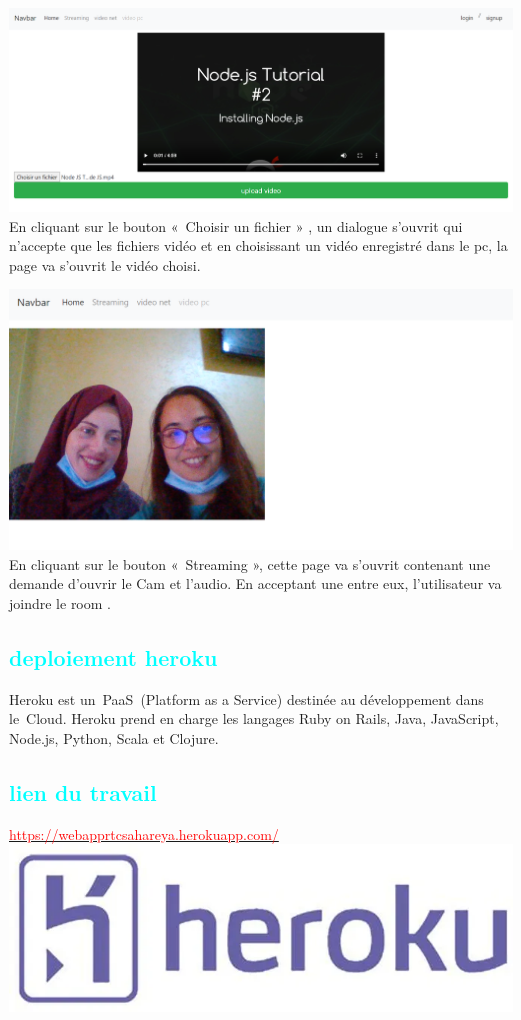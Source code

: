     \includegraphics[width=15cm]{images/videoPc2.png}\\
    En cliquant sur le bouton « Choisir un fichier » , un dialogue s’ouvrit qui n’accepte que les fichiers vidéo et en choisissant un vidéo enregistré dans le pc, la page va s’ouvrit le vidéo choisi.\par
    \includegraphics[width=15cm]{images/streaming.png}\\
    En cliquant sur le bouton « Streaming », cette page va s’ouvrit contenant une demande d’ouvrir le Cam et l’audio. En acceptant une entre eux, l’utilisateur va joindre le room .\par

\subsection{\textcolor{cyan}{deploiement heroku}}
Heroku est un PaaS (Platform as a Service) destinée au développement dans le Cloud. Heroku prend en charge les langages Ruby on Rails, Java, JavaScript, Node.js, Python, Scala et Clojure.\par
\subsection{\textcolor{cyan}{lien du travail}}
\hyperlink{https://webapprtcsahareya.herokuapp.com/}{\textcolor{red}{https://webapprtcsahareya.herokuapp.com/}}\\
\includegraphics[width=15cm]{images/heroku.png}\\